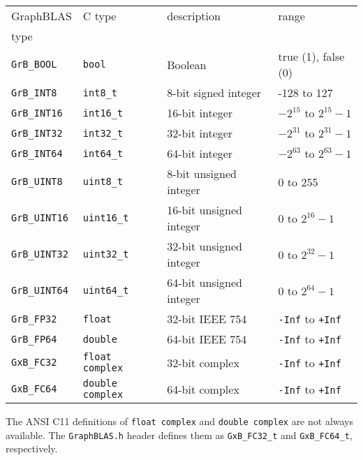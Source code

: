 \documentclass[12pt]{article}
\begin{document}
\vspace{0.2in}
\noindent
{\footnotesize
\begin{tabular}{llll}
\hline
GraphBLAS         & C type           & description              & range \\
type              &                  &                          & \\
\hline
\verb'GrB_BOOL'   & \verb'bool'      & Boolean                  & true (1), false (0) \\
\hline
\verb'GrB_INT8'   & \verb'int8_t'    & 8-bit signed integer     & -128 to 127 \\
\verb'GrB_INT16'  & \verb'int16_t'   & 16-bit integer           & $-2^{15}$ to $2^{15}-1$ \\
\verb'GrB_INT32'  & \verb'int32_t'   & 32-bit integer           & $-2^{31}$ to $2^{31}-1$ \\
\verb'GrB_INT64'  & \verb'int64_t'   & 64-bit integer           & $-2^{63}$ to $2^{63}-1$ \\
\hline
\verb'GrB_UINT8'  & \verb'uint8_t'   & 8-bit unsigned integer   & 0 to 255 \\
\verb'GrB_UINT16' & \verb'uint16_t'  & 16-bit unsigned integer  & 0 to $2^{16}-1$ \\
\verb'GrB_UINT32' & \verb'uint32_t'  & 32-bit unsigned integer  & 0 to $2^{32}-1$ \\
\verb'GrB_UINT64' & \verb'uint64_t'  & 64-bit unsigned integer  & 0 to $2^{64}-1$ \\
\hline
\verb'GrB_FP32'   & \verb'float'     & 32-bit IEEE 754          & \verb'-Inf' to \verb'+Inf'\\
\verb'GrB_FP64'   & \verb'double'    & 64-bit IEEE 754          & \verb'-Inf' to \verb'+Inf'\\
\hline
\verb'GxB_FC32'   & \verb'float complex'  & 32-bit complex & \verb'-Inf' to \verb'+Inf'\\
\verb'GxB_FC64'   & \verb'double complex' & 64-bit complex & \verb'-Inf' to \verb'+Inf'\\
\hline
\end{tabular}
}
\vspace{0.2in}

The ANSI C11 definitions of \verb'float complex' and \verb'double complex'
are not always available.  The \verb'GraphBLAS.h' header defines them as
\verb'GxB_FC32_t' and \verb'GxB_FC64_t', respectively.
\end{document}
